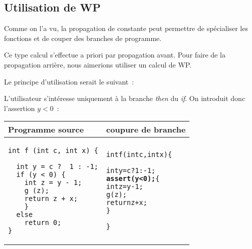 \subsection{Utilisation de WP}

Comme on l'a vu, la propagation de constante peut permettre de
spécialiser les fonctions et de couper des branches de programme.

Ce type calcul s'effectue a priori par propagation avant. 
Pour faire de la propagation arrière, 
nous aimerions utiliser un calcul de WP.

Le principe d'utilisation serait le suivant~:

\begin{exemple1}
  L'utilisateur s'intéresse uniquement à la branche {\it then} du {\it if}.
  On introduit donc l'assertion $y<0$~:\\

\begin{center}
\begin{footnotesize}
\begin{tabular}{|p{5cm}|p{5cm}|}
  \hline
Programme source & coupure de branche \\
  \hline
\begin{verbatim}
int f (int c, int x) {

  int y = c ?  1 : -1;
  if (y < 0) {
    int z = y - 1;
    g (z);
    return z + x;
    }
  else
    return 0;
}
\end{verbatim}
&
\begin{alltt}
int f (int c, int x) \{

  int y = c ?  1 : -1;
 {\bf assert (y < 0); }\{
  int z = y - 1;
  g (z);
  return z + x;
  \}


\}
\end{alltt}
\\
\hline
\end{tabular}
\end{footnotesize}
\end{center}
\end{exemple1}
